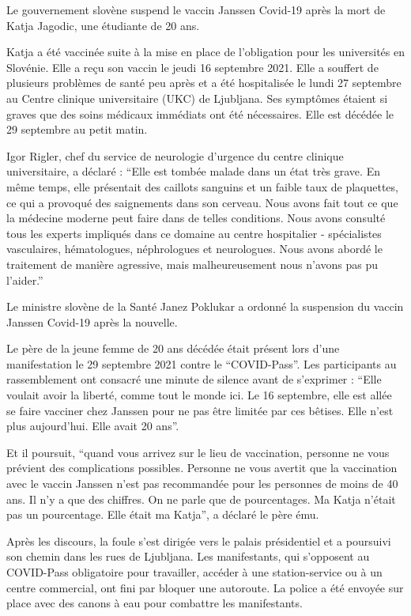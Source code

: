Le gouvernement slovène suspend le vaccin Janssen Covid-19 après la mort de
Katja Jagodic, une étudiante de 20 ans.

Katja a été vaccinée suite à la mise en place de l'obligation pour les
universités en Slovénie. Elle a reçu son vaccin le jeudi 16 septembre 2021. Elle
a souffert de plusieurs problèmes de santé peu après et a été hospitalisée le
lundi 27 septembre au Centre clinique universitaire (UKC) de Ljubljana. Ses
symptômes étaient si graves que des soins médicaux immédiats ont été
nécessaires. Elle est décédée le 29 septembre au petit matin.

Igor Rigler, chef du service de neurologie d'urgence du centre clinique
universitaire, a déclaré : “Elle est tombée malade dans un état très grave. En
même temps, elle présentait des caillots sanguins et un faible taux de
plaquettes, ce qui a provoqué des saignements dans son cerveau. Nous avons fait
tout ce que la médecine moderne peut faire dans de telles conditions. Nous avons
consulté tous les experts impliqués dans ce domaine au centre hospitalier -
spécialistes vasculaires, hématologues, néphrologues et neurologues. Nous avons
abordé le traitement de manière agressive, mais malheureusement nous n'avons pas
pu l'aider.”

Le ministre slovène de la Santé Janez Poklukar a ordonné la suspension du vaccin
Janssen Covid-19 après la nouvelle.

Le père de la jeune femme de 20 ans décédée était présent lors d'une
manifestation le 29 septembre 2021 contre le “COVID-Pass”. Les participants au
rassemblement ont consacré une minute de silence avant de s'exprimer : “Elle
voulait avoir la liberté, comme tout le monde ici. Le 16 septembre, elle est
allée se faire vacciner chez Janssen pour ne pas être limitée par ces
bêtises. Elle n'est plus aujourd'hui. Elle avait 20 ans”.

Et il poursuit, “quand vous arrivez sur le lieu de vaccination, personne ne vous
prévient des complications possibles. Personne ne vous avertit que la
vaccination avec le vaccin Janssen n'est pas recommandée pour les personnes de
moins de 40 ans. Il n'y a que des chiffres. On ne parle que de pourcentages. Ma
Katja n'était pas un pourcentage. Elle était ma Katja”, a déclaré le père ému.

Après les discours, la foule s'est dirigée vers le palais présidentiel et a
poursuivi son chemin dans les rues de Ljubljana. Les manifestants, qui
s'opposent au COVID-Pass obligatoire pour travailler, accéder à une
station-service ou à un centre commercial, ont fini par bloquer une
autoroute. La police a été envoyée sur place avec des canons à eau pour
combattre les manifestants.

